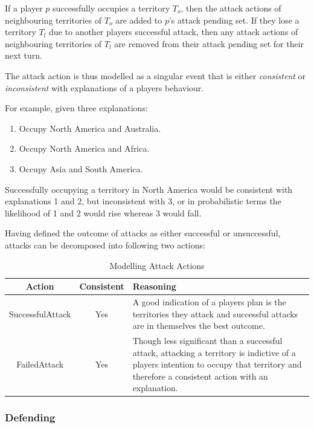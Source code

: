 \documentclass[parskip]{cs4rep}
\begin{document}
If a player $p$ successfully occupies a territory $T_{o}$, then the attack actions of neighbouring territories of $T_{o}$ are added to $p$'s attack pending set. If they lose a territory $T_{l}$ due to another players successful attack, then any attack actions of neighbouring territories of $T_{l}$ are removed from their attack pending set for their next turn. 

The attack action is thus modelled as a singular event that is either \textit{consistent} or \textit{inconsistent} with explanations of a players behaviour.

For example, given three explanations:

\begin{enumerate}
\item
Occupy North America and Australia.
\item
Occupy North America and Africa.
\item
Occupy Asia and South America.
\end{enumerate}

Successfully occupying a territory in North America would be consistent with explanations 1 and 2, but inconsistent with 3, or in probabilistic terms the likelihood of 1 and 2 would rise whereas 3 would fall.

Having defined the outcome of attacks as either successful or unsuccessful, attacks can be decomposed into following two actions: 

\begin{table}[ht]
\centering
\begin{tabular}{|c|c|p{8cm}|}
\hline 
\textbf{Action} & \textbf{Consistent}  & \textbf{Reasoning} \\ 
\hline 
SuccessfulAttack & Yes & A good indication of a players plan is the territories they attack and successful attacks are in themselves the best outcome. \\ 
\hline 
FailedAttack & Yes & Though less significant than a successful attack, attacking a territory is indictive of a players intention to occupy that territory and therefore a consistent action with an explanation.\\ 
\hline
\end{tabular}
\caption{Modelling Attack Actions}
\label{table:attack-defend-modelling}
\end{table}

\newpage

\subsubsection{Defending}
\end{document}
